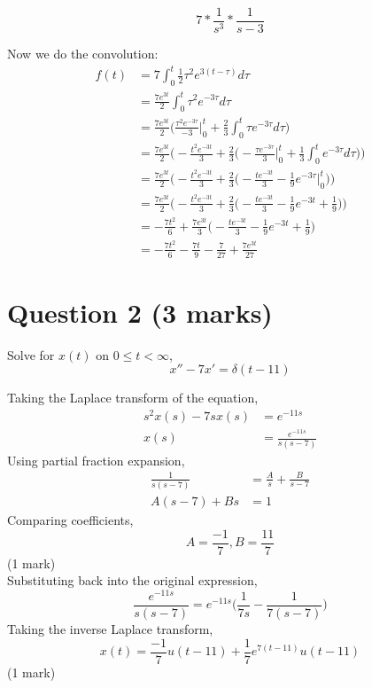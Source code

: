 \documentclass[12pt]{article}
\begin{document}
$$7 * \frac{1}{s^3} * \frac{1}{s-3}$$

\noindent Now we do the convolution:
\begin{align*}
    f(t) &= 7 \int_0^{t} \frac{1}{2}\tau^2e^{3(t - \tau)} d\tau \tag{1 mark}
      \\ &= \frac{7e^{3t}}{2} \int_0^t \tau^2e^{-3\tau} d\tau
      \\ &= \frac{7e^{3t}}{2}
        \bigg(\frac{\tau^2e^{-3\tau}}{-3} \bigg|_0^t
        + \frac{2}{3} \int_0^t \tau e^{-3\tau} d\tau \bigg)
      \\ &= \frac{7e^{3t}}{2} \bigg(-\frac{t^2e^{-3t}}{3}
        + \frac{2}{3} \bigg(-\frac{\tau e^{-3\tau}}{3} \bigg|_0^t
        + \frac{1}{3} \int_0^t e^{-3\tau} d\tau \bigg) \bigg)
      \\ &= \frac{7e^{3t}}{2} \bigg(-\frac{t^2e^{-3t}}{3}
        + \frac{2}{3} \bigg(-\frac{te^{-3t}}{3}
        - \frac{1}{9} e^{-3\tau} \bigg|_0^t \bigg) \bigg)
      \\ &= \frac{7e^{3t}}{2} \bigg(-\frac{t^2e^{-3t}}{3}
        + \frac{2}{3} \bigg(-\frac{te^{-3t}}{3}
        - \frac{1}{9} e^{-3t} + \frac{1}{9} \bigg) \bigg)
      \\ &= -\frac{7t^2}{6}
        + \frac{7e^{3t}}{3} \bigg(-\frac{te^{-3t}}{3}
        - \frac{1}{9} e^{-3t} + \frac{1}{9} \bigg) \tag{1 mark for solving integration}
      \\ &= -\frac{7t^2}{6} -\frac{7t}{9}
        - \frac{7}{27} + \frac{7e^{3t}}{27} \tag{1 mark}
\end{align*}

\section*{Question 2 (3 marks)}
Solve for $x(t)$ on $0 \leq t < \infty$, $$x''-7x'=\delta(t-11)$$

\noindent Taking the Laplace transform of the equation,
\begin{align*}
  s^2x(s) - 7sx(s) &= e^{-11s} \\
  x(s) &= \frac{e^{-11s}}{s(s-7)} \tag{1 mark}
\end{align*}
Using partial fraction expansion,
\begin{align*}
  \frac{1}{s(s-7)} &= \frac{A}{s} + \frac{B}{s-7} \\
  A(s-7) + Bs &= 1
\end{align*}
Comparing coefficients, $$A=\frac{-1}{7}, B=\frac{11}{7}$$\hfill(1 mark) \\ Substituting back into the original expression, $$\frac{e^{-11s}}{s(s-7)} = e^{-11s}\bigg(\frac{1}{7s} - \frac{1}{7(s-7)}\bigg)$$ Taking the inverse Laplace transform, $$x(t)=\frac{-1}{7}u(t-11) + \frac{1}{7}e^{7(t-11)}u(t-11)$$\hfill(1 mark)
\end{document}
